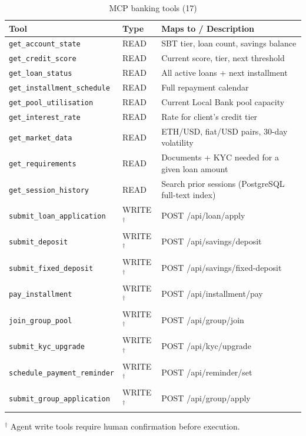 \documentclass[12pt, a4paper]{report}
\newcommand{\tableheadcolor}{\rowcolor{TableHeadBg}}
\begin{document}
\begin{table}[H]
\centering
\caption[MCP banking tools (17)]{MCP banking tools (17)}
\label{tab:mcp-tools}
\begin{tabular}{p{4.8cm}p{1.4cm}p{6.3cm}}
\toprule
\tableheadcolor
\textbf{Tool} & \textbf{Type} & \textbf{Maps to / Description} \\
\midrule
\texttt{get\_account\_state} & READ & SBT tier, loan count, savings balance \\
\texttt{get\_credit\_score} & READ & Current score, tier, next threshold \\
\texttt{get\_loan\_status} & READ & All active loans + next installment \\
\texttt{get\_installment\_schedule} & READ & Full repayment calendar \\
\texttt{get\_pool\_utilisation} & READ & Current Local Bank pool capacity \\
\texttt{get\_interest\_rate} & READ & Rate for client's credit tier \\
\texttt{get\_market\_data} & READ & ETH/USD, fiat/USD pairs, 30-day volatility \\
\texttt{get\_requirements} & READ & Documents + KYC needed for a given loan amount \\
\texttt{get\_session\_history} & READ & Search prior sessions (PostgreSQL full-text index) \\
\texttt{submit\_loan\_application} & WRITE$^{\dagger}$ & POST /api/loan/apply \\
\texttt{submit\_deposit} & WRITE$^{\dagger}$ & POST /api/savings/deposit \\
\texttt{submit\_fixed\_deposit} & WRITE$^{\dagger}$ & POST /api/savings/fixed-deposit \\
\texttt{pay\_installment} & WRITE$^{\dagger}$ & POST /api/installment/pay \\
\texttt{join\_group\_pool} & WRITE$^{\dagger}$ & POST /api/group/join \\
\texttt{submit\_kyc\_upgrade} & WRITE$^{\dagger}$ & POST /api/kyc/upgrade \\
\texttt{schedule\_payment\_reminder} & WRITE$^{\dagger}$ & POST /api/reminder/set \\
\texttt{submit\_group\_application} & WRITE$^{\dagger}$ & POST /api/group/apply \\
\bottomrule
\end{tabular}

\vspace{4pt}
\noindent\small$^{\dagger}$ Agent write tools require human confirmation before execution.
\end{table}
\end{document}

